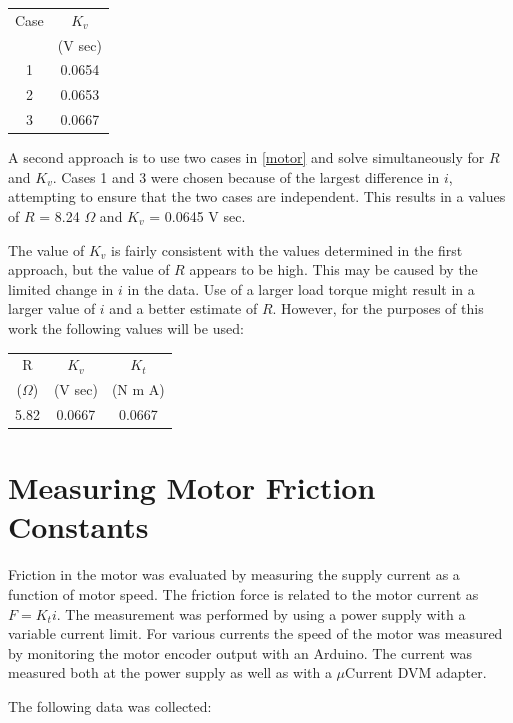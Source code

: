 \documentclass[12pt,letterpaper]{article}
\begin{document}
\begin{appendices}
\begin{tabular}{|c|c|}
\hline
Case & $K_{v}$  \\
         & (V sec) \\
\hline
1    & 0.0654  \\
2    & 0.0653  \\
3    & 0.0667  \\
\hline
\end{tabular}

A second approach is to use two cases in \eqref{motor} and solve simultaneously for $R$ and $K_{v}$.
Cases 1 and 3 were chosen because of the largest difference in $i$, attempting to ensure that the two
cases are independent.  This results in a values of $R$ = 8.24 $\Omega$ and $K_{v}$ = 0.0645 V sec.

The value of $K_{v}$ is fairly consistent with the values determined in the first approach, but the value
of $R$ appears to be high.  This may be caused by the limited change in $i$ in the data.  Use of a larger
load torque might result in a larger value of $i$ and a better estimate of $R$.  However, for the purposes
of this work the following values will be used:

\begin{tabular}{|c|c|c|}
\hline
R                   & $K_{v}$  & $K_{t}$ \\
($\Omega$)   & (V sec)   & (N m A) \\
\hline
5.82    & 0.0667  & 0.0667  \\
\hline
\end{tabular}

\section{Measuring Motor Friction Constants}
\label{appendix:friction}
Friction in the motor was evaluated by measuring the supply current as a function of motor speed.
The friction force is related to the motor current as $F = K_{t} i$.  The measurement was performed
by using a power supply with a variable current limit.  For various currents the speed of the motor
was measured by monitoring the motor encoder output with an Arduino.  The current was measured
both at the power supply as well as with a $\mu$Current DVM adapter.

The following data was collected:


\end{appendices}
\end{document}
